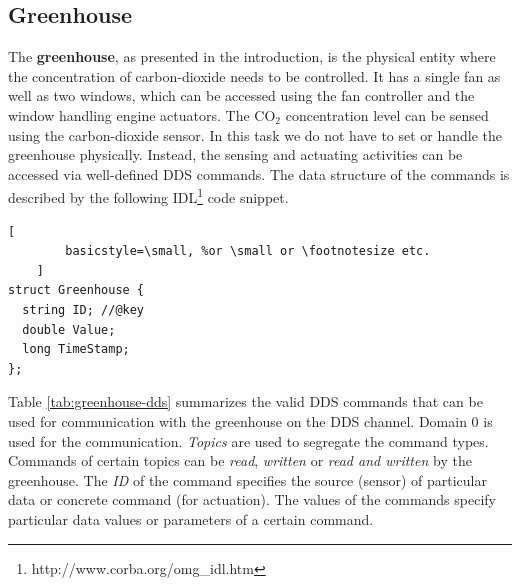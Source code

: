\documentclass[a4paper, 11pt]{article}
\begin{document}
	\subsection{Greenhouse}
	\label{sec:greenhouse}
	The \textbf{greenhouse}, as presented in the introduction, is the physical entity where the concentration of carbon-dioxide needs to be controlled. It has a single fan as well as two windows, which can be accessed using the fan controller and the window handling engine actuators. The CO$_2$ concentration level can be sensed using the carbon-dioxide sensor. In this task we do not have to set or handle the greenhouse physically. Instead, the sensing and actuating activities can be accessed via well-defined DDS commands. The data structure of the commands is described by the following IDL\footnote{http://www.corba.org/omg\_idl.htm} code snippet.
	\begin{lstlisting}[
		basicstyle=\small, %or \small or \footnotesize etc.
	]
struct Greenhouse {
  string ID; //@key
  double Value;
  long TimeStamp;
};
	\end{lstlisting}
	
	Table \ref{tab:greenhouse-dds} summarizes the valid DDS commands that can be used for communication with the greenhouse on the DDS channel. Domain 0 is used for the communication. \emph{Topics} are used to segregate the command types.  Commands of certain topics can be \emph{read}, \emph{written} or \emph{read and written} by the greenhouse. The \emph{ID} of the command specifies the source (sensor) of particular data or concrete command (for actuation). The values of the commands specify particular data values or parameters of a certain command.
	
\end{document}
